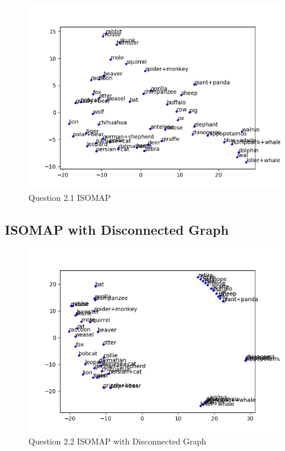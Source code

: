 \documentclass{article}
\begin{document}
\begin{figure}[h!]
    \includegraphics[width=48em]{q2_1.png}
    \caption{Question 2.1 ISOMAP}
    \label{fig:q2_1}
\end{figure}


\subsection{ISOMAP with Disconnected Graph}

\begin{figure}[h!]
    \includegraphics[width=48em]{q2_2.png}
    \caption{Question 2.2 ISOMAP with Disconnected Graph}
    \label{fig:q2_2}
\end{figure}
\end{document}
